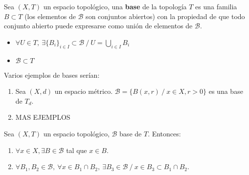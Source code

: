 \begin{ndef}[Base]
  Sea $(X,T)$ un espacio topológico, una \textbf{base} de la topología $T$ es una familia $B \subset T$ (los elementos de $\mathcal{B}$ son conjuntos abiertos) con la propiedad de que todo conjunto abierto puede expresarse como unión de elementos de $\mathcal{B}$.
  \begin{itemize}
    \item $\forall U \in T,\ \exists \{B_i\}_{i \in I} \subset \mathcal{B}\ /\ U=\bigcup_{i \in I} B_i$
    \item $\mathcal{B} \subset T$
  \end{itemize}
\end{ndef}
\begin{exmp}
  Varios ejemplos de bases serían:
  \begin{enumerate}
    \item Sea $(X,d)$ un espacio métrico. $\mathcal{B}=\{B(x,r)\ /\ x \in X, r>0\}$ es una base de $T_d$.
    \item MAS EJEMPLOS
  \end{enumerate}
\end{exmp}

\begin{properties}
  Sea $(X,T)$ un espacio topológico, $\mathcal{B}$ base de $T$. Entonces:
  \begin{enumerate}
    \item $\forall x \in X, \exists B \in \mathcal{B}$ tal que $x \in B$.
    \item $\forall B_1,B_2 \in \mathcal{B},\ \forall x \in B_1 \cap B_2,\ \exists B_3 \in \mathcal{B}\ /\ x \in B_3 \subset B_1 \cap B_2$.
  \end{enumerate}
\end{properties}

